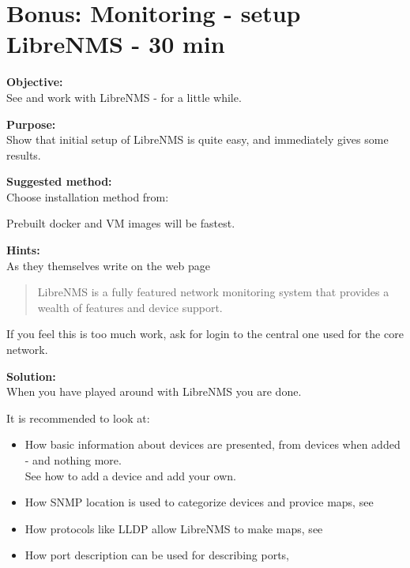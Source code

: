 \documentclass[a4paper,11pt,notitlepage]{report}
\begin{document}
\chapter{Bonus: Monitoring - setup LibreNMS - 30 min}
\label{ex:librenms-setup}

{\bf Objective:}\\
See and work with LibreNMS - for a little while.

{\bf Purpose:}\\
Show that initial setup of LibreNMS is quite easy, and immediately gives some results.

{\bf Suggested method:}\\
Choose installation method from:\\

Prebuilt docker and VM images will be fastest.

{\bf Hints:}\\
As they themselves write on the web page 

\begin{quote}
LibreNMS is a fully featured network monitoring system that provides a wealth of features and device support.
\end{quote}

If you feel this is too much work, ask for login to the central one used for the core network.

{\bf Solution:}\\
When you have played around with LibreNMS you are done.

It is recommended to look at:
\begin{itemize}
\item How basic information about devices are presented, from devices when added - and nothing more.\\
See how to add a device and add your own. 
\item How SNMP location is used to categorize devices and provice maps, see 
\item How protocols like LLDP allow LibreNMS to make maps, see 
\item How port description can be used for describing ports, 
\end{itemize}
\end{document}
